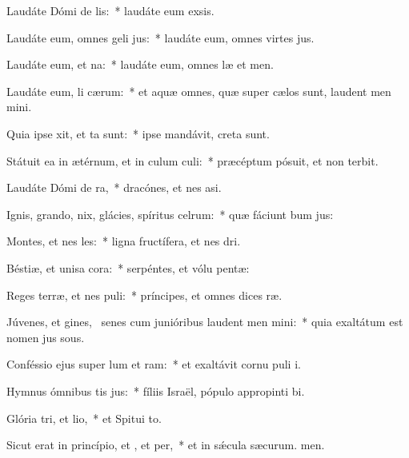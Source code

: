 \item Laudáte Dómi de lis:~* laudáte eum  exsis.
\item Laudáte eum, omnes geli jus:~* laudáte eum, omnes virtes jus.
\item Laudáte eum,  et na:~* laudáte eum, omnes læ et men.
\item Laudáte eum, li cærum:~* et aquæ omnes, quæ super cælos sunt, laudent men mini.
\item Quia ipse xit, et ta sunt:~* ipse mandávit,  creta sunt.
\item Státuit ea in ætérnum, et in culum culi:~* præcéptum pósuit, et non terbit.
\item Laudáte Dómi de ra,~* dracónes, et nes asi.
\item Ignis, grando, nix, glácies, spíritus celrum:~* quæ fáciunt bum jus:
\item Montes, et nes les:~* ligna fructífera, et nes dri.
\item Béstiæ, et unisa cora:~* serpéntes, et vólu pentæ:
\item Reges terræ, et nes puli:~* príncipes, et omnes dices ræ.
\item Júvenes, et gines,~\pscross{} senes cum junióribus laudent men mini:~* quia exaltátum est nomen jus sous.
\item Conféssio ejus super lum et ram:~* et exaltávit cornu puli i.
\item Hymnus ómnibus tis jus:~* fíliis Israël, pópulo appropinti bi.
\item Glória tri, et lio,~* et Spitui to.
\item Sicut erat in princípio, et , et per,~* et in sǽcula sæcurum. men.
